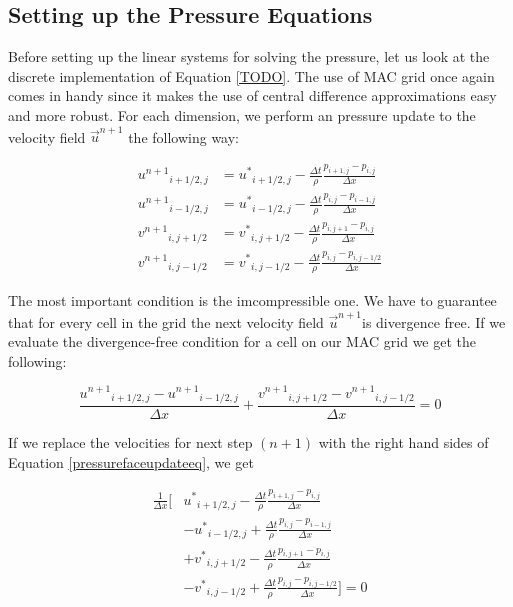 \subsection{Setting up the Pressure Equations}

Before setting up the linear systems for solving the pressure, let us look at the discrete implementation of Equation \ref {TODO}. The use of MAC grid once again comes in handy since it makes the use of central difference approximations easy and more robust. For each dimension, we perform an pressure update to the velocity field $\vec{u}^{n+1}$ the following way:

\begin{equation}
\begin{split}
{u^{n+1}}_{i+1/2,j} &= {u^*}_{i+1/2,j} - \frac{\Delta t }{\rho}\frac{p_{i+1,j} - p_{i,j}}{\Delta x} \\
{u^{n+1}}_{i-1/2,j} &= {u^*}_{i-1/2,j} - \frac{\Delta t }{\rho}\frac{p_{i,j} - p_{i-1,j}}{\Delta x} \\
{v^{n+1}}_{i,j+1/2} &= {v^*}_{i,j+1/2} - \frac{\Delta t }{\rho}\frac{p_{i,j+1} - p_{i,j}}{\Delta x} \\
{v^{n+1}}_{i,j-1/2} &= {v^*}_{i,j-1/2} - \frac{\Delta t }{\rho}\frac{p_{i,j} - p_{i,j-1/2}}{\Delta x}
\end{split}
\label{pressurefaceupdateeq}
\end{equation}

The most important condition is the imcompressible one. We have to guarantee that for every cell in the grid the next velocity field $\vec{u}^{n+1}$is divergence free. If we evaluate the divergence-free condition for a cell on our MAC grid we get the following:

\begin{equation}
\frac{{u^{n+1}}_{i+1/2,j} - {u^{n+1}}_{i-1/2,j}}{\Delta x} + \frac{{v^{n+1}}_{i,j+1/2} - {v^{n+1}}_{i,j-1/2}}{\Delta x} = 0
\end{equation}

If we replace the velocities for next step $(n+1)$ with the right hand sides of Equation \ref{pressurefaceupdateeq}, we get

\begin{equation}
\begin{split}
\frac{1}{\Delta x}[ &{u^*}_{i+1/2,j} - \frac{\Delta t }{\rho}\frac{p_{i+1,j} - p_{i,j}}{\Delta x}
\\
& - {u^*}_{i-1/2,j} + \frac{\Delta t }{\rho}\frac{p_{i,j} - p_{i-1,j}}{\Delta x} \\
& + {v^*}_{i,j+1/2} - \frac{\Delta t }{\rho}\frac{p_{i,j+1} - p_{i,j}}{\Delta x} \\
& -{v^*}_{i,j-1/2} + \frac{\Delta t }{\rho}\frac{p_{i,j} - p_{i,j-1/2}}{\Delta x} ] = 0
\end{split}
\label{pressurebeforeeq}
\end{equation}

